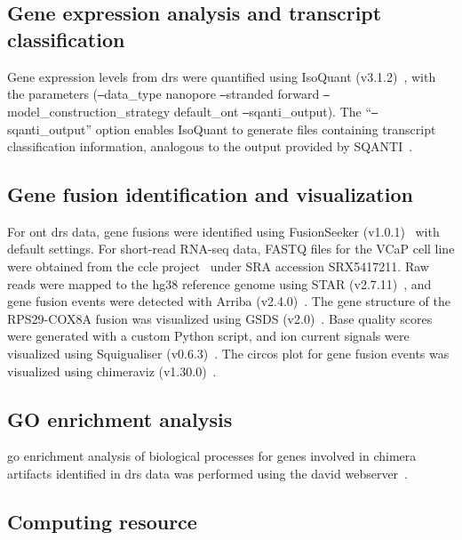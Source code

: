 \documentclass[pdflatex,sn-nature, lineno]{sn-jnl}%
\begin{document}
\subsection{Gene expression analysis and transcript classification}

Gene expression levels from \gls{drs} were quantified using IsoQuant (v3.1.2)~\cite{prjibelski2023accurate}, with the parameters (\texttt{--}data\_type nanopore \texttt{--}stranded forward \texttt{--}model\_construction\_strategy default\_ont \texttt{--}sqanti\_output). The ``\texttt{--}sqanti\_output'' option enables IsoQuant to generate files containing transcript classification information, analogous to the output provided by SQANTI~\cite{tardaguila2018sqanti}.


\subsection{Gene fusion identification and visualization}

For \gls{ont} \gls{drs} data, gene fusions were identified using FusionSeeker (v1.0.1)~\cite{chen2023gene} with default settings.
For short-read RNA-seq data, FASTQ files for the VCaP cell line were obtained from the \gls{ccle} project~\cite{barretina2012cancer} under SRA accession SRX5417211.
Raw reads were mapped to the hg38 reference genome using STAR (v2.7.11)~\cite{dobin2013star}, and gene fusion events were detected with Arriba (v2.4.0)~\cite{uhrig2021accurate}.
The gene structure of the RPS29-COX8A fusion was visualized using GSDS (v2.0)~\cite{hu2015gsds}.
Base quality scores were generated with a custom Python script, and ion current signals were visualized using Squigualiser (v0.6.3)~\cite{samarakoon2024interactive}.
The circos plot for gene fusion events was visualized using chimeraviz (v1.30.0)~\cite{laagstad2017chimeraviz}.

\subsection{GO enrichment analysis}

\gls{go} enrichment analysis of biological processes for genes involved in chimera artifacts identified in \gls{drs} data was performed using the \gls{david} webserver~\cite{sherman2022david}.

\subsection{Computing resource}
\end{document}
